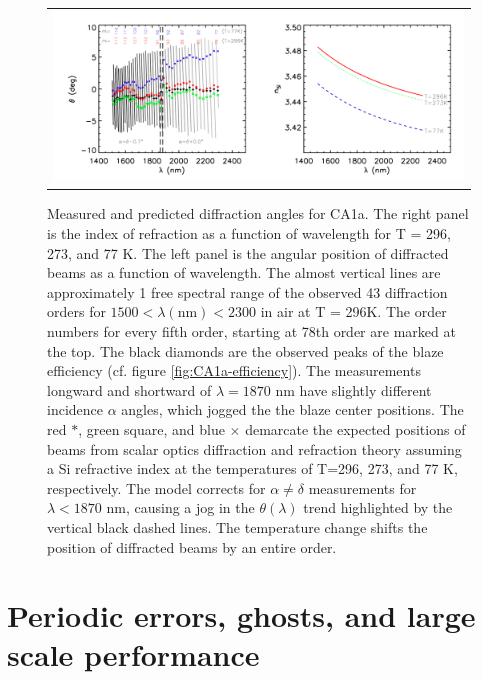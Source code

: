 \begin{figure}
\begin{center}
 \begin{tabular}{c}
    \includegraphics[width=1.0\textwidth]{chSPIE_2012_CA1/figs/CA1a_diffrac}
   \end{tabular}
  \end{center}
  \caption[CA1a Diffraction]{\label{fig:CA1a-diffrac} Measured and predicted diffraction angles for CA1a.  The right panel is the index of refraction as a function of wavelength \cite{2006SPIE.6273E..77F} for T = 296, 273, and 77 K.  The left panel is the angular position of diffracted beams as a function of wavelength.  The almost vertical lines are approximately 1 free spectral range of the observed 43 diffraction orders for $1500 < \lambda (\textrm{nm}) < 2300$ in air at T = 296K.  The order numbers for every fifth order, starting at 78th order are marked at the top.  The black diamonds are the observed peaks of the blaze efficiency (cf. figure \ref{fig:CA1a-efficiency}).  The measurements longward and shortward of $\lambda=1870$ nm have slightly different incidence $\alpha$ angles, which jogged the the blaze center positions.  The red $\ast$, green square, and blue $\times$ demarcate the expected positions of beams from scalar optics diffraction and refraction theory assuming a Si refractive index at the temperatures of T=296, 273, and 77 K, respectively.  The model corrects for $\alpha \neq \delta$ measurements for $\lambda < 1870 $ nm, causing a jog in the $\theta(\lambda)$ trend highlighted by the vertical black dashed lines.  The temperature change shifts the position of diffracted beams by an entire order.}
\end{figure}

\section{Periodic errors, ghosts, and large scale performance} 

